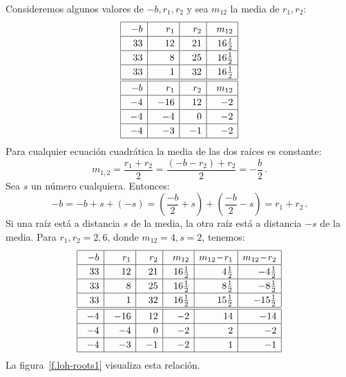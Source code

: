 Consideremos algunos valores de $-b,r_1,r_2$ y sea $m_{12}$ la media de $r_1,r_2$:
\[
\renewcommand{\arraystretch}{1.2}
\begin{array}{|@{\hspace{1em}}r|@{\hspace{1em}}r|@{\hspace{1em}}r|@{\hspace{1em}}r|}
\hline
-b& r_1 & r_2 &m_{12}\\\hline
33 & 12 & 21 & 16\frac{1}{2}\\\hline
33 & 8 & 25 & 16\frac{1}{2}\\\hline
33 & 1 & 32 & 16\frac{1}{2}\\\hline\hline
-b& r_1 & r_2 &m_{12}\\\hline
-4 & -16 & 12 & -2 \\\hline
-4 & -4 & 0 & -2 \\\hline
-4 & -3 & -1 & -2 \\\hline
\end{array}
\]
Para cualquier ecuación cuadrática la media de las dos raíces es constante:
\[
m_{1,2}=\frac{r_1+r_2}{2}=
\frac{(-b-r_2)+r_2}{2}=
-\frac{b}{2}\,.
\]
Sea $s$ un número cualquiera. Entonces:
\[
-b=-b+s+(-s)=\left(\frac{-b}{2}+s\right) + \left(\frac{-b}{2}-s\right)=r_1+r_2\,.
\]
Si una raíz está a distancia $s$ de la media, la otra raíz está a distancia $-s$ de la media. Para $r_1,r_2=2,6$, donde $m_{12}=4, s=2$, tenemos:
\[
\renewcommand{\arraystretch}{1.2}
\begin{array}{|@{\hspace{1em}}r|@{\hspace{1em}}r|@{\hspace{1em}}r|@{\hspace{1em}}r|r|r|}
\hline
-b& r_1 & r_2 & m_{12}& m_{12}\!-\!r_1 & m_{12}\!-\!r_2\\\hline
33 & 12 & 21 & 16\frac{1}{2}&4\frac{1}{2} & -4\frac{1}{2}  \\\hline
33 & 8 & 25 & 16\frac{1}{2}&8\frac{1}{2}&-8\frac{1}{2}\\\hline
33 & 1 & 32 & 16\frac{1}{2}&15\frac{1}{2}&-15\frac{1}{2}\\\hline
\hline
-4 & -16 & 12 & -2 &14& -14\\\hline
-4 & -4 & 0 & -2&2&-2 \\\hline
-4 & -3 & -1 & -2&1&-1 \\\hline
\end{array}
\]
La figura~\ref{f.loh-roots1} visualiza esta relación.
